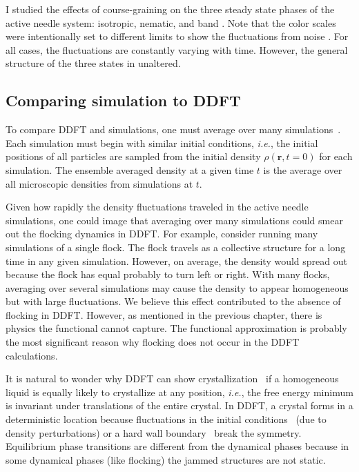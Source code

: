 I studied the effects of course-graining on the three steady state phases of
the active needle system: isotropic, nematic, and band
. Note that the color scales were intentionally set
to different limits to show the fluctuations from noise
. For all cases, the fluctuations are constantly
varying with time. However, the general structure of the three states in
unaltered. 

\subsection{Comparing simulation to DDFT}
To compare DDFT and simulations, one must average over many
simulations~\cite{dzubiella_meanfield_03, archer_dynamical_05,
  archer_interplay_11}. Each simulation must begin with similar initial
conditions, \textit{i.e.}, the initial positions of all particles are sampled
from the initial density $\rho(\bm{r}, t=0)$ for each simulation. The ensemble
averaged density at a given time $t$ is the average over all microscopic
densities from simulations at $t$. 

Given how rapidly the density fluctuations traveled in the active needle
simulations, one could image that averaging over many simulations could smear
out the flocking dynamics in DDFT\@.  For example, consider running many
simulations of a single flock. The flock travels as a collective structure for a
long time in any given simulation. However, on average, the density would spread
out because the flock has equal probably to turn left or right. With many
flocks, averaging over several simulations may cause the density to appear
homogeneous but with large fluctuations.  We believe this effect contributed to
the absence of flocking in DDFT\@. However, as mentioned in the previous
chapter, there is physics the functional cannot capture. The functional
approximation is probably the most significant reason why flocking does not
occur in the DDFT calculations.

It is natural to wonder why DDFT can show
crystallization~\cite{choudhary_ddft_11,kahl_classical_09,archer_quasicrystalline_13}
if a homogeneous liquid is equally likely to crystallize at any
position, \textit{i.e.}, the free energy minimum is invariant under
translations of the entire crystal. In DDFT, a crystal forms in a deterministic
location because fluctuations in the initial
conditions~\cite{malijevsky_sedimentation_13} (due to density perturbations) or
a hard wall boundary~\cite{archer_quasicrystalline_13} break the symmetry.
Equilibrium phase transitions are different from the dynamical phases because in
some dynamical phases (like flocking) the jammed structures are not static.

